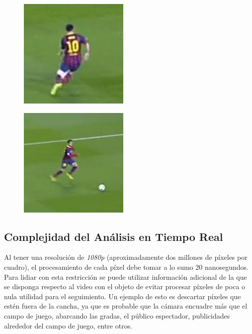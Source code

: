 \begin{figure}[H]
    \begin{minipage}[t]{.5\textwidth}
        \centering
        \includegraphics[width=.4\linewidth]{./images/resize_barcelona2.png}
        \label{fig:barsa3}
    \end{minipage}%
    \begin{minipage}[t]{.5\textwidth}
        \centering
        \includegraphics[width=.4\linewidth]{./images/resize_barcelona3.png}
        \label{fig:barsa4}
    \end{minipage}
\end{figure}

\subsection{Complejidad del Análisis en Tiempo Real}

Al tener una resolución de \textit{1080p} (aproximadamente dos millones de
píxeles por cuadro), el procesamiento de cada píxel debe tomar a lo sumo 20
nanosegundos.  Para lidiar con esta restricción se puede utilizar información
adicional de la que se disponga respecto al video con el objeto de evitar
procesar píxeles de poca o nula utilidad para el seguimiento. Un ejemplo de esto
es descartar píxeles que estén fuera de la cancha, ya que es probable que la
cámara encuadre más que el campo de juego, abarcando las gradas, el público
espectador, publicidades alrededor del campo de juego, entre otros.


